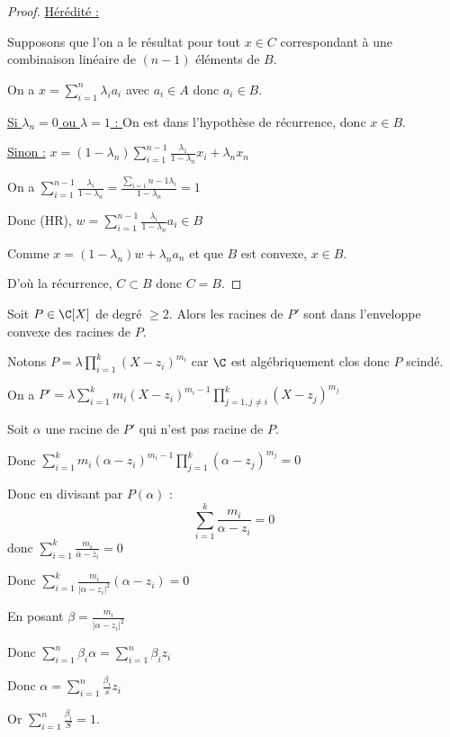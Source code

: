 \begin{proof}
    \uline{Hérédité :}

    Supposons que l'on a le résultat pour tout $x \in C$ correspondant à une combinaison
    linéaire de $(n - 1)$ éléments de $B$. 

    On a $\displaystyle x = \sum_{i = 1}^{n } \lambda_i a_i$ avec $a_i \in A$ donc $a_i \in B$.

    \quad \underline{Si $\lambda_n = 0$ ou $\lambda = 1$ : } On est dans l'hypothèse 
    de récurrence, donc $x \in B$. 

    \quad \underline{Sinon :} $\displaystyle x = (1 - \lambda_n) \sum_{i = 1}^{n - 1} \frac{\lambda_1}{1 - \lambda_n} x_i + \lambda_n x_n$

    On a $\displaystyle \sum_{i = 1}^{n - 1} \frac{\lambda_i}{1 - \lambda_n} = \frac{\sum_{i = 1}{n - 1} \lambda_i}{1 - \lambda_n} = 1$

    Donc (HR), $\displaystyle w = \sum_{i = 1}^{n-1} \frac{\lambda_i}{1 - \lambda_n} a_i \in B$

    Comme $\displaystyle x = (1 - \lambda_n)w + \lambda_n a_n$ et que $B$ est convexe, $x \in B$. 

    D'où la récurrence, $C \subset B$ donc $C = B$. 

\end{proof}

\begin{exemple}
    Soit $P \in \C[X]$ de degré $\geqslant 2$. Alors les racines de $P'$ sont dans 
    l'enveloppe convexe des racines de $P$. 

    Notons $\displaystyle P = \lambda \prod_{i = 1}^{k }(X - z_i)^{m_i}$ car $\C$ est algébriquement clos
    donc $P$ scindé. 

    On a $\displaystyle P' = \lambda \sum_{i = 1}^{k } m_i (X - z_i)^{m_i - 1} \prod_{j = 1, j \neq i}^{k}(X - z_j)^{m_j}$

    Soit $\alpha$ une racine de $P'$ qui n'est pas racine de $P$.

    Donc $\displaystyle \sum_{i = 1}^{k }m_i(\alpha - z_i)^{m_i - 1} \prod_{j = 1}^{k } (\alpha - z_j)^{m_j} = 0$

    Donc en divisant par $P(\alpha)$ : 
    $$ \sum_{i = 1}^{k } \frac{m_i}{\alpha - z_i} = 0$$
    donc $\displaystyle \sum_{i = 1}^{k } \frac{m_i}{\bar \alpha - \bar z_i} = 0$
    
    Donc $\displaystyle \sum_{i = 1}^{k }\frac{m_i }{|\alpha - z_i|^2} (\alpha - z_i) = 0$
    
    En posant $\beta = \frac{m_i}{|\alpha - z_i|^2}$
    
    Donc $\displaystyle \sum_{i = 1}^{n }\beta_i \alpha = \sum_{i = 1}^{n } \beta_i z_i$

    Donc $\displaystyle \alpha = \sum_{i = 1}^{n }\frac{\beta_i}{s} z_i$

    Or $\displaystyle \sum_{i = 1}^{n }\frac{\beta_i }{S } = 1$. 
\end{exemple}

